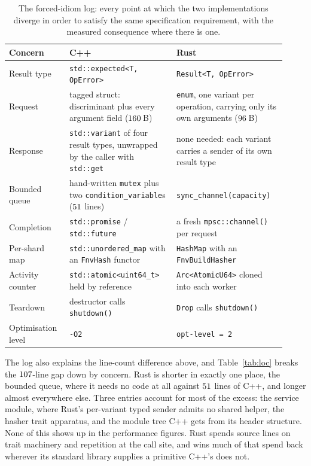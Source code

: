 \documentclass[english,oneside,a4paper,censored,csm,software-track-2020]{HYthesisML}
\begin{document}
\begin{appendices}
\begin{table}[H]
\centering
\small
\caption[The forced-idiom log]{The forced-idiom log: every point at which the two implementations diverge in order
to satisfy the same specification requirement, with the measured consequence where there is
one.\label{tab:idioms}}
\begin{tabular}{@{}R{0.20\linewidth} R{0.36\linewidth} R{0.36\linewidth}@{}}
\hline\hline
Concern & C++ & Rust \\
\hline
Result type & \texttt{std::expected<T, OpError>} & \texttt{Result<T, OpError>} \\
Request & tagged struct: discriminant plus every argument field ($160$\,B) & \texttt{enum}, one variant per operation, carrying only its own arguments ($96$\,B) \\
Response & \texttt{std::variant} of four result types, unwrapped by the caller with \texttt{std::get} & none needed: each variant carries a sender of its own result type \\
Bounded queue & hand-written \texttt{mutex} plus two \texttt{condition\_variable}s ($51$ lines) & \texttt{sync\_channel(capacity)} \\
Completion & \texttt{std::promise} / \texttt{std::future} & a fresh \texttt{mpsc::channel()} per request \\
Per-shard map & \texttt{std::unordered\_map} with an \texttt{FnvHash} functor & \texttt{HashMap} with an \texttt{FnvBuildHasher} \\
Activity counter & \texttt{std::atomic<uint64\_t>} held by reference & \texttt{Arc<AtomicU64>} cloned into each worker \\
Teardown & destructor calls \texttt{shutdown()} & \texttt{Drop} calls \texttt{shutdown()} \\
Optimisation level & \texttt{-O2} & \texttt{opt-level = 2} \\
\hline
\end{tabular}
\end{table}

The log also explains the line-count difference above, and Table~\ref{tab:loc} breaks the
$107$-line gap down by concern. Rust is shorter in exactly one place, the bounded queue,
where it needs no code at all against $51$ lines of C++, and longer almost
everywhere else. Three entries account for most of the excess: the service module, where Rust's
per-variant typed sender admits no shared helper, the hasher trait apparatus, and the module tree
C++ gets from its header structure. None of this shows up in the performance figures. Rust
spends source lines on trait machinery and repetition at the call site, and wins much of that
spend back wherever its standard library supplies a primitive C++'s does not.


\end{appendices}
\end{document}
